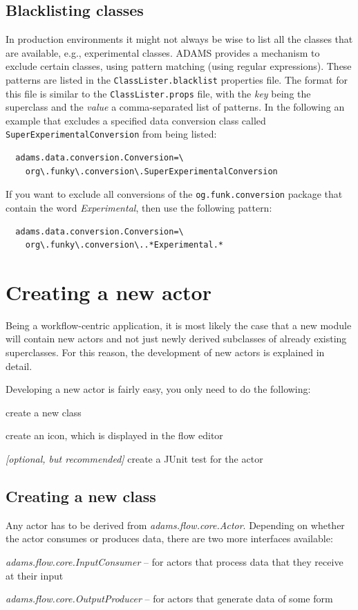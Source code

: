 \subsection{Blacklisting classes}
In production environments it might not always be wise to list all the classes
that are available, e.g., experimental classes. ADAMS provides a mechanism to
exclude certain classes, using pattern matching (using regular expressions).
These patterns are listed in the \texttt{ClassLister.blacklist} properties file.
The format for this file is similar to the \texttt{ClassLister.props} file, with
the \textit{key} being the superclass and the \textit{value} a comma-separated
list of patterns. In the following an example that excludes a specified data
conversion class called \texttt{SuperExperimentalConversion} from being listed:
\begin{verbatim}
  adams.data.conversion.Conversion=\
    org\.funky\.conversion\.SuperExperimentalConversion
\end{verbatim}
If you want to exclude all conversions of the \texttt{og.funk.conversion}
package that contain the word \textit{Experimental}, then use the following
pattern:
\begin{verbatim}
  adams.data.conversion.Conversion=\
    org\.funky\.conversion\..*Experimental.*
\end{verbatim}

\section{Creating a new actor}
Being a workflow-centric application, it is most likely the case that a new
module will contain new actors and not just newly derived subclasses of already
existing superclasses. For this reason, the development of new actors is
explained in detail.

Developing a new actor is fairly easy, you only need to do the following:
\begin{tight_itemize}
	\item create a new class
	\item create an icon, which is displayed in the flow editor
	\item \textit{[optional, but recommended]} create a JUnit test for the actor
\end{tight_itemize}

\subsection{Creating a new class}
Any actor has to be derived from \textit{adams.flow.core.Actor}.
Depending on whether the actor consumes or produces data, there are two more
interfaces available:
\begin{tight_itemize}
	\item \textit{adams.flow.core.InputConsumer} -- for actors that process data
	that they receive at their input
	\item \textit{adams.flow.core.OutputProducer} -- for actors that generate data
	of some form
\end{tight_itemize}

